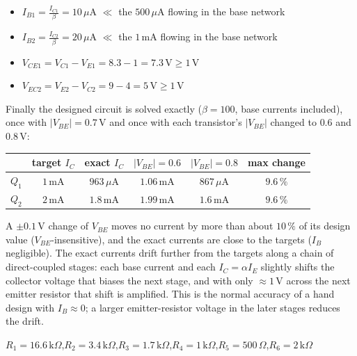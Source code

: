 \documentclass[11pt]{article}
\newcommand{\solstep}[2]{\par\medskip{\color{stepc}\textbf{Step #1 --- #2}}\par\nopagebreak}
\begin{document}
\solstep{4}{Check the design}\begin{itemize}[leftmargin=*,itemsep=2pt]
\item $I_{B1} = \frac{I_{C1}}{\beta} = 10\,\mu \mathrm{A}$ $\ll$ the $500\,\mu \mathrm{A}$ flowing in the base network \checkmark
\item $I_{B2} = \frac{I_{C2}}{\beta} = 20\,\mu \mathrm{A}$ $\ll$ the $1\,\mathrm{m}\mathrm{A}$ flowing in the base network \checkmark
\item $V_{CE1} = V_{C1} - V_{E1} = 8.3 - 1 = 7.3\,\mathrm{V} \ge 1$\,V \checkmark
\item $V_{EC2} = V_{E2} - V_{C2} = 9 - 4 = 5\,\mathrm{V} \ge 1$\,V \checkmark
\end{itemize}
Finally the designed circuit is solved exactly ($\beta=100$, base currents included), once with $|V_{BE}|=0.7$\,V and once with each transistor's $|V_{BE}|$ changed to $0.6$ and $0.8$\,V:\begin{center}\renewcommand{\arraystretch}{1.35}
\begin{tabular}{cccccc}
\toprule
 & target $I_C$ & exact $I_C$ & $|V_{BE}|=0.6$ & $|V_{BE}|=0.8$ & max change \\
\midrule
$Q_{1}$ & $1\,\mathrm{m}\mathrm{A}$ & $963\,\mu \mathrm{A}$ & $1.06\,\mathrm{m}\mathrm{A}$ & $867\,\mu \mathrm{A}$ & $9.6\,\%$ \\
$Q_{2}$ & $2\,\mathrm{m}\mathrm{A}$ & $1.8\,\mathrm{m}\mathrm{A}$ & $1.99\,\mathrm{m}\mathrm{A}$ & $1.6\,\mathrm{m}\mathrm{A}$ & $9.6\,\%$ \\
\bottomrule
\end{tabular}\end{center}
A $\pm0.1$\,V change of $V_{BE}$ moves no current by more than about $10\,\%$ of its design value ($V_{BE}$-insensitive), and the exact currents are close to the targets ($I_B$ negligible). The exact currents drift further from the targets along a chain of direct-coupled stages: each base current and each $I_C = \alpha I_E$ slightly shifts the collector voltage that biases the next stage, and with only $\approx1$\,V across the next emitter resistor that shift is amplified. This is the normal accuracy of a hand design with $I_B\approx0$; a larger emitter-resistor voltage in the later stages reduces the drift.
\begin{ansbox}
$R_{1} = 16.6\,\mathrm{k}\Omega$,\quad $R_{2} = 3.4\,\mathrm{k}\Omega$,\quad $R_{3} = 1.7\,\mathrm{k}\Omega$,\quad $R_{4} = 1\,\mathrm{k}\Omega$,\quad $R_{5} = 500\,\Omega$,\quad $R_{6} = 2\,\mathrm{k}\Omega$
\end{ansbox}
\end{document}
